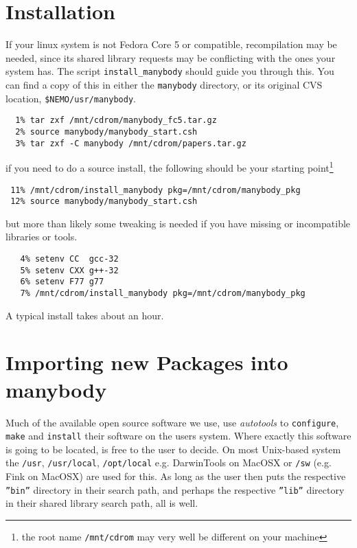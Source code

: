 {\section{Installation}

If your linux system is not Fedora Core 5
or compatible, recompilation may be needed, since its shared library requests
may be conflicting with the ones your system has.
The script
{\tt install\_manybody} should guide you through this. You can find a copy
of this in either the {\tt manybody} directory, or its original CVS location,
{\tt \$NEMO/usr/manybody}.

\footnotesize\begin{verbatim}
  1% tar zxf /mnt/cdrom/manybody_fc5.tar.gz
  2% source manybody/manybody_start.csh
  3% tar zxf -C manybody /mnt/cdrom/papers.tar.gz

\end{verbatim}\normalsize

if you need to do a source install, the following should be 
your starting point\footnote{the root name {\tt /mnt/cdrom} may
very well be different on your machine}

\footnotesize\begin{verbatim}
 11% /mnt/cdrom/install_manybody pkg=/mnt/cdrom/manybody_pkg
 12% source manybody/manybody_start.csh
\end{verbatim}\normalsize

but more than likely some tweaking is needed if you have missing or
incompatible libraries or tools. 


\footnotesize\begin{verbatim}
   4% setenv CC  gcc-32
   5% setenv CXX g++-32
   6% setenv F77 g77
   7% /mnt/cdrom/install_manybody pkg=/mnt/cdrom/manybody_pkg
\end{verbatim}\normalsize


A typical install takes about an hour.

\section{Importing new Packages into manybody}

Much of the available open source software we use, use
{\it autotools} to {\tt configure}, {\tt make} and {\tt install} their
software on the users system. Where exactly this software is going to be located,
is free to the user to decide. On most Unix-based system the {\tt /usr},
{\tt /usr/local}, {\tt /opt/local} {e.g. DarwinTools on MacOSX} 
or {\tt /sw} (e.g. Fink on MacOSX) are used for this.
As long
as the user then puts the respective {\tt ''bin''} directory in their search
path, and perhaps the respective {\tt ''lib''}  directory in their 
shared library search path, all is well.

}
